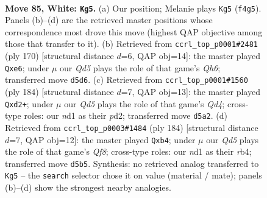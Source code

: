 \documentclass[11pt]{article}
\begin{document}
\clearpage

\begin{figure}[p]\centering
\begin{subfigure}{0.46\textwidth}\centering
\resizebox{\linewidth}{!}{%
\newchessgame
\chessboard[
  setfen={8/P6k/8/3Q4/5K2/8/8/3n4 w - - 1 85},
  showmover=false,
  pgfstyle=straightmove, color=movearrow, markmove={f4-g5}
]}
\caption{}
\end{subfigure}\hfill
\begin{subfigure}{0.46\textwidth}\centering
\resizebox{\linewidth}{!}{%
\newchessgame
\chessboard[
  setfen={6K1/2k5/4n2Q/4P3/8/8/8/8 w - - 3 86},
  showmover=false,
  pgfstyle=straightmove, color=movearrow, markmove={h6-e6}
]}
\caption{}
\end{subfigure}
\\[4pt]
\begin{subfigure}{0.46\textwidth}\centering
\resizebox{\linewidth}{!}{%
\newchessgame
\chessboard[
  setfen={4q3/8/8/6P1/3Q4/8/k2p3K/8 w - - 4 93},
  showmover=false,
  pgfstyle=straightmove, color=movearrow, markmove={d4-d2}
]}
\caption{}
\end{subfigure}\hfill
\begin{subfigure}{0.46\textwidth}\centering
\resizebox{\linewidth}{!}{%
\newchessgame
\chessboard[
  setfen={5Q2/8/8/3k2K1/1r6/8/8/8 w - - 2 93},
  showmover=false,
  pgfstyle=straightmove, color=movearrow, markmove={f8-b4}
]}
\caption{}
\end{subfigure}
\caption{\textbf{Move 85, White: \texttt{Kg5}.} (a) Our position; Melanie plays \texttt{Kg5} (\texttt{f4g5}). Panels (b)--(d) are the retrieved master positions whose correspondence most drove this move (highest QAP objective among those that transfer to it). (b) Retrieved from \texttt{ccrl\_top\_p0001\#2481} (ply 170) [structural distance $d$=6, QAP obj=14]: the master played \texttt{Qxe6}; under $\mu$ our \emph{Qd5} plays the role of that game's \emph{Qh6}; transferred move \texttt{d5d6}. (c) Retrieved from \texttt{ccrl\_top\_p0001\#1560} (ply 184) [structural distance $d$=7, QAP obj=13]: the master played \texttt{Qxd2+}; under $\mu$ our \emph{Qd5} plays the role of that game's \emph{Qd4}; cross-type roles: our \emph{n}d1 as their \emph{p}d2; transferred move \texttt{d5a2}. (d) Retrieved from \texttt{ccrl\_top\_p0003\#1484} (ply 184) [structural distance $d$=7, QAP obj=12]: the master played \texttt{Qxb4}; under $\mu$ our \emph{Qd5} plays the role of that game's \emph{Qf8}; cross-type roles: our \emph{n}d1 as their \emph{r}b4; transferred move \texttt{d5b5}. Synthesis: no retrieved analog transferred to \texttt{Kg5} -- the \texttt{search} selector chose it on value (material / mate); panels (b)--(d) show the strongest nearby analogies.}
\label{fig:thought-m168}
\end{figure}
\end{document}
